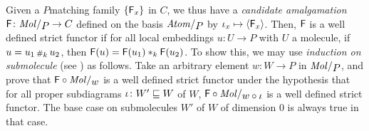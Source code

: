 \begin{comm} \label{comm:well_defined_amalgamation}
    Given a \( P \)\nbd matching family \( \left\{ {\mathsf{F}_x} \right\} \) in \( C \), we thus have a \emph{candidate amalgamation} \( \F \colon \molecin{P} \to C \) defined on the basis \( \atomin{P} \) by \( \iota_{x} \mapsto \langle\mathsf{F}_x\rangle \).
    Then, \( \mathsf{F} \) is a well defined strict functor if for all local embeddings \( u \colon U \to P \) with \( U \) a molecule, if \( u = u_1 \,{\scriptstyle\#}_{k}\, u_2 \), then \( \mathsf{F}(u) = \mathsf{F}(u_1) *_{k} \mathsf{F}(u_2) \).
    To show this, we may use \emph{induction on submolecule} (see \cite[Comment 4.1.7]{hadzihasanovic2024combinatorics}) as follows.
    Take an arbitrary element \( w \colon W \to P \) in \( \molecin{P} \), and prove that \( \F \after \molecin{w} \) is a well defined strict functor under the hypothesis that for all proper subdiagrams \( \iota \colon W' \sqsubseteq W \) of \( W \), \( \F \after \molecin{w \after \iota} \) is a well defined strict functor.
    The base case on submolecules \( W' \) of \( W \) of dimension \( 0 \) is always true in that case. 
\end{comm}

